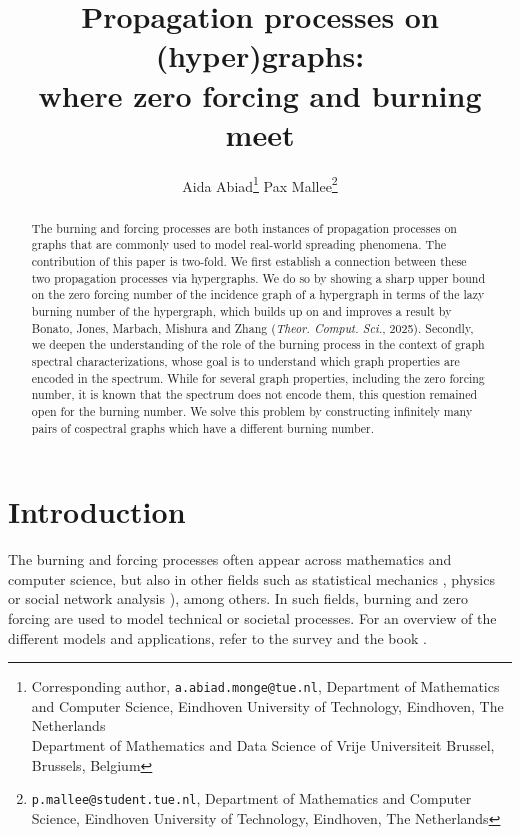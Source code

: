 \documentclass[12pt]{article}
\title{Propagation processes on (hyper)graphs:\\ where zero forcing and burning meet}
\author{Aida Abiad\thanks{Corresponding author,  \texttt{a.abiad.monge@tue.nl}, Department of Mathematics and Computer Science, Eindhoven University of Technology, Eindhoven, The Netherlands\\Department of Mathematics and Data Science of Vrije Universiteit Brussel, Brussels, Belgium}\qquad 
\qquad Pax Mallee\thanks{\texttt{p.mallee@student.tue.nl},  Department of Mathematics and Computer Science, Eindhoven University of Technology, Eindhoven, The Netherlands}
}
\date{}
\theoremstyle{plain}
\theoremstyle{definition}
\theoremstyle{remark}
\begin{document}
\maketitle



\begin{abstract}
The burning and forcing processes are both instances of propagation processes on graphs that are commonly used to model real-world spreading phenomena. The contribution of this paper is two-fold. We first establish a connection between these two propagation processes via hypergraphs. We do so by showing a sharp upper bound on the zero forcing number of the incidence graph of a hypergraph in terms of the lazy burning number of the hypergraph, which builds up on and improves a result by Bonato, Jones, Marbach, Mishura and Zhang (\emph{Theor. Comput. Sci.}, 2025). Secondly, we deepen the understanding of the role of the burning process in the context of graph spectral characterizations, whose goal is to understand which graph properties are encoded in the spectrum. While for several graph properties, including the zero forcing number, it is known that the spectrum does not encode them, this question remained open for the burning number. We solve this problem by constructing infinitely many pairs of cospectral graphs which have a different burning number.
\end{abstract}

\section{Introduction}




The burning and forcing processes often appear across mathematics and computer science, but also in other fields such as statistical mechanics \cite{CLR1979}, physics \cite{ARENAS200893} or social network analysis \cite{G1978}), among others. In such fields, burning and zero forcing are used to model technical or societal processes. For an overview of the different models and
applications, refer to the survey \cite{survey-burning-number} and the book \cite{hogben2022inverse}.
\end{document}
